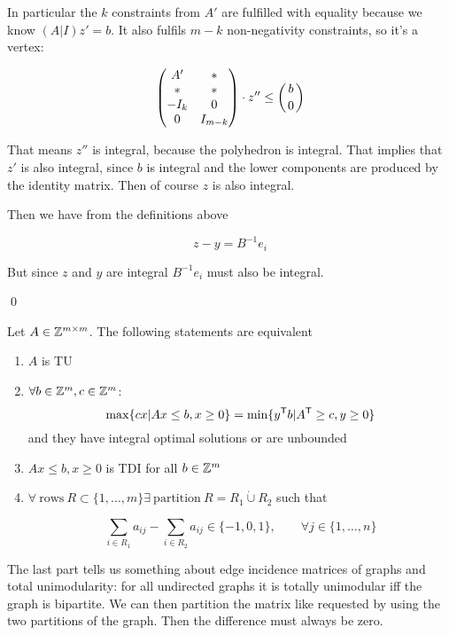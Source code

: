 \begin{pr}
In particular the $k$ constraints from $A'$ are fulfilled with equality because we know $(A|I)z'=b$. It also fulfils $m-k$ non-negativity constraints, so it's a vertex:

\[\begin{pmatrix}
A' & *\\
* & *\\
-I_k & 0 \\
0 & I_{m-k}
\end{pmatrix} \cdot z'' \leq \left(b \atop 0\right)\]

That means $z''$ is integral, because the polyhedron is integral. That implies that $z'$ is also integral, since $b$ is integral and the lower components are produced by the identity matrix. Then of course $z$ is also integral.

Then we have from the definitions above

\[z-y=B^{-1}e_i\]

But since $z$ and $y$ are integral $B^{-1}e_i$ must also be integral.

\qed \end{pr}

\begin{thm} Let $A\in \mathbb{Z}^{m\times m}$. The following statements are equivalent
\begin{enumerate}
\item $A$ is TU
\item $\forall b \in \mathbb{Z}^m, c\in \mathbb{Z}^m$:
\[\max \{cx|Ax\leq b, x\geq 0\} = \min \{{y}^\text{\upshape \sffamily T} b|{A}^\text{\upshape \sffamily T} \geq c, y\geq 0\}\]
and they have integral optimal solutions or are unbounded
\item $Ax\leq b, x\geq 0$ is TDI for all $b\in \mathbb{Z}^m$
\item $\forall\ \text{rows}\ R\subset \{1,\ldots, m\} \exists\ \text{partition}\ R = R_1 \dot \cup R_2$ such that

\[\sum_{i\in R_1} a_{ij} - \sum_{i\in R_2} a_{ij} \in \{-1,0,1\}, \qquad \forall j\in \{1,\ldots, n\}\]
\end{enumerate}
\end{thm}

The last part tells us something about edge incidence matrices of graphs and total unimodularity: for all undirected graphs it is totally unimodular iff the graph is bipartite. We can then partition the matrix like requested by using the two partitions of the graph. Then the difference must always be zero.
